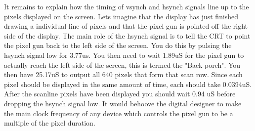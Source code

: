                             \begin{table}[ht]
                            \end{table}

                            It remains to explain how the timing of vsynch and hsynch signals
                            line up to the pixels displayed on the screen.  Lets imagine that
                            the display has just finished drawing a individual line of pixels
                            and that the pixel gun is pointed off the right side of the display.
                            The main role of the hsynch signal is to tell the CRT to point the
                            pixel gun back to the left side of the screen.  You do this by pulsing
                            the hsynch signal low for 3.77us.  You then need to wait 1.89uS for
                            the pixel gun to actually reach the left side of the screen, this is
                            termed the "Back porch".  You then have 25.17uS to output all 640 pixels
                            that form that scan row.  Since each pixel should be displayed in
                            the same amount of time, each should take 0.0394uS.  After the scanline
                            pixels have been displayed you should wait 0.94 uS before dropping
                            the hsynch signal low.  It would behoove the digital designer to make
                            the main clock frequency of any device which controls the pixel gun to
                            be a multiple of the pixel duration.


